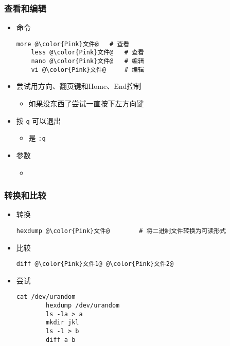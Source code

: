 \begin{frame} [fragile]
	\frametitle{查看和编辑}
	\linespread{1.25}
	\begin{itemize}
	\item 命令
	\begin{lstlisting}[style=bashstyle, gobble=4, texcl, escapechar=@]
	more @\color{Pink}文件@	# 查看
	less @\color{Pink}文件@	# 查看
	nano @\color{Pink}文件@	# 编辑
	vi @\color{Pink}文件@		# 编辑
	\end{lstlisting}
	\item 尝试用方向、翻页键和Home、End控制
		\begin{itemize}
		\item 如果没东西了尝试一直按下左方向键
		\end{itemize}
	\item 按 \texttt{q} 可以退出
		\begin{itemize}
		\item {}是 \texttt{:q}
		\end{itemize}
	\item 参数
		\begin{itemize}
		\item {}
		\end{itemize}
	\end{itemize}
\end{frame}

\begin{frame} [fragile]
	\frametitle{转换和比较}
	\linespread{1.25}
	\begin{itemize}
	\item 转换
		\begin{lstlisting}[style=bashstyle, gobble=8, texcl, escapechar=@]
		hexdump @\color{Pink}文件@		# 将二进制文件转换为可读形式
		\end{lstlisting}
	\item 比较
		\begin{lstlisting}[style=bashstyle, gobble=8, texcl, escapechar=@]
		diff @\color{Pink}文件1@ @\color{Pink}文件2@
		\end{lstlisting}
	\item 尝试
		\begin{lstlisting}[style=bashstyle, gobble=8, texcl, escapechar=@]
		cat /dev/urandom
		hexdump /dev/urandom
		ls -la > a
		mkdir jkl
		ls -l > b
		diff a b
		\end{lstlisting}
	\end{itemize}
\end{frame}

